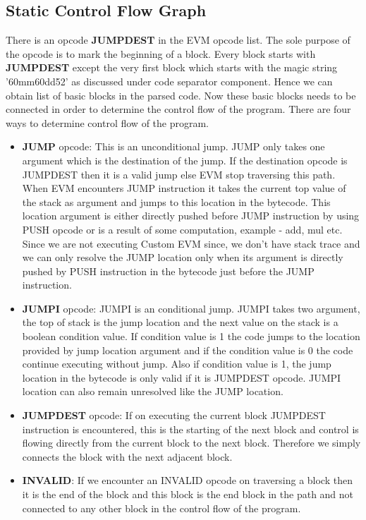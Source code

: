 \subsection{Static Control Flow Graph}
There is an opcode \textbf{JUMPDEST} in the EVM opcode list. The sole purpose of the opcode is to mark the beginning of a block. Every block starts with \textbf{JUMPDEST} except the very first block which starts with the magic string '60mm60dd52' as discussed under code separator component. Hence we can obtain list of basic blocks in the parsed code. Now these basic blocks needs to be connected in order to determine the control flow of the program. There are four ways to determine control flow of the program.
\begin{itemize}
    \item \textbf{JUMP} opcode: This is an unconditional jump. JUMP only takes one argument which is the destination of the jump. If the destination opcode is JUMPDEST then it is a valid jump else EVM stop traversing this path. When EVM encounters JUMP instruction it takes the current top value of the stack as argument and jumps to this location in the bytecode. This location argument is either directly pushed before JUMP instruction by using PUSH opcode or is a result of some computation, example - add, mul etc. Since we are not executing Custom EVM since, we don't have stack trace and we can only resolve the JUMP location only when its argument is directly pushed by PUSH instruction in the bytecode just before the JUMP instruction.
    \item \textbf{JUMPI} opcode: JUMPI is an conditional jump. JUMPI takes two argument, the top of stack is the jump location and the next value on the stack is a boolean condition value. If condition value is 1 the code jumps to the location provided by jump location argument and if the condition value is 0 the code continue executing without jump. Also if condition value is 1, the jump location in the bytecode is only valid if it is JUMPDEST opcode. JUMPI location can also remain unresolved like the JUMP location.
    \item \textbf{JUMPDEST} opcode: If on executing the current block JUMPDEST instruction is encountered, this is the starting of the next block and control is flowing directly from the current block to the next block. Therefore we simply connects the block with the next adjacent block.
    \item \textbf{INVALID}: If we encounter an INVALID opcode on traversing a block then it is the end of the block and this block is the end block in the path and not connected to any other block  in the control flow of the program.
\end{itemize}
